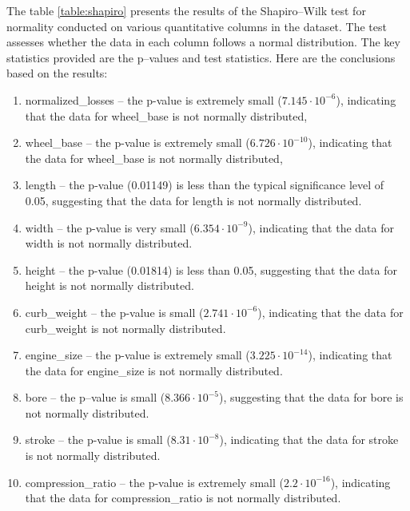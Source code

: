 \documentclass[11pt,a4paper]{article}\usepackage[]{graphicx}\usepackage[]{xcolor}
\begin{document}
		
		The table \ref{table:shapiro} presents the results of the Shapiro--Wilk test for normality conducted on various quantitative columns in the dataset. The test assesses whether the data in each column follows a normal distribution. The key statistics provided are the p--values and test statistics. Here are the conclusions based on the results:
\begin{enumerate}
\item normalized\_losses -- the p-value is extremely small ($7.145 \cdot 10^{-6}$), indicating that the data for wheel\_base is not normally distributed,

\item wheel\_base -- the p-value is extremely small ($6.726 \cdot 10^{-10}$), indicating that the data for wheel\_base is not normally distributed,

\item length -- the p-value (0.01149) is less than the typical significance level of 0.05, suggesting that the data for length is not normally distributed.

\item width -- the p-value is very small ($6.354 \cdot 10^{-9}$), indicating that the data for width is not normally distributed.

\item height -- the p-value (0.01814) is less than 0.05, suggesting that the data for height is not normally distributed.

\item curb\_weight -- the p-value is small ($2.741 \cdot 10^{-6}$), indicating that the data for curb\_weight is not normally distributed.

\item engine\_size -- the p-value is extremely small ($3.225 \cdot 10^{-14}$), indicating that the data for engine\_size is not normally distributed.

\item bore -- the p--value is small ($8.366 \cdot 10^{-5}$), suggesting that the data for bore is not normally distributed.

\item stroke -- the p-value is small ($8.31 \cdot 10^{-8}$), indicating that the data for stroke is not normally distributed.

\item compression\_ratio -- the p-value is extremely small ($2.2 \cdot 10^{-16}$), indicating that the data for compression\_ratio is not normally distributed.


\end{enumerate}
\end{document}
